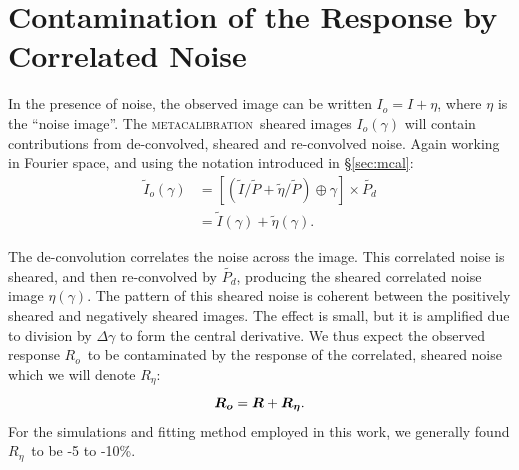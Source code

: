 \documentclass[iop]{emulateapj}
\newcommand{\mcal}{\textsc{metacalibration}}
\newcommand{\mcalR}{\mbox{\boldmath $R$}}
\newcommand{\mcalRo}{\mbox{\boldmath $R_o$}}
\newcommand{\mcalRnoise}{\mbox{\boldmath $R_\eta$}}
\newcommand{\Itild}{\mbox{$\widetilde{I}$}}
\newcommand{\ntil}{\mbox{$\widetilde{\eta}$}}
\newcommand{\Ptil}{\mbox{$\widetilde{P}$}}
\newcommand{\Ptild}{\mbox{$\widetilde{P_d}$}}
\newcommand{\SSs}{$\left<R_{S}R_{S}\right>$}
\begin{document}

\section{Contamination of the Response by Correlated Noise} \label{sec:contam}

In the presence of noise, the observed image can be written $I_o=I+\eta$, where $\eta$
is the ``noise image''.  The \mcal\ sheared images $I_o(\gamma)$ will contain
contributions from de-convolved, sheared and re-convolved noise. Again working
in Fourier space, and using the notation introduced in \S \ref{sec:mcal}:
\begin{align}
    \Itild_o(\gamma) &= \left[ \left( \Itild/\Ptil + \ntil/\Ptil \right) \oplus \gamma \right] \times \Ptild  \nonumber \\
    &= \Itild(\gamma) + \ntil(\gamma).
\end{align}

The de-convolution correlates the noise across the image.  This correlated
noise is sheared, and then re-convolved by \Ptild, producing the
sheared correlated noise image $\eta(\gamma)$.  The pattern of this sheared
noise is coherent between the positively sheared and negatively sheared images.
The effect is small, but it is amplified due to division by $\Delta \gamma$ to
form the central derivative.  We thus expect the observed response \mcalRo\ to
be contaminated by the response of the correlated, sheared noise which
we will denote \mcalRnoise:
\begin{equation}
    \mbox{\mcalRo}  =  \mcalR + \mbox{\mcalRnoise}.
\end{equation}
For the simulations and fitting method employed in this work, we generally
found \mcalRnoise\ to be -5 to -10\%.
\end{document}
